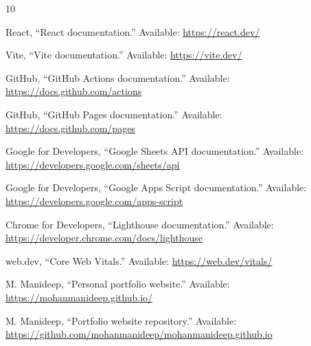 \documentclass[10pt,a4paper,twocolumn]{article}
\begin{document}
\begin{thebibliography}{10}

React, ``React documentation.'' Available: \url{https://react.dev/}

Vite, ``Vite documentation.'' Available: \url{https://vite.dev/}

GitHub, ``GitHub Actions documentation.'' Available: \url{https://docs.github.com/actions}

GitHub, ``GitHub Pages documentation.'' Available: \url{https://docs.github.com/pages}

Google for Developers, ``Google Sheets API documentation.'' Available: \url{https://developers.google.com/sheets/api}

Google for Developers, ``Google Apps Script documentation.'' Available: \url{https://developers.google.com/apps-script}

Chrome for Developers, ``Lighthouse documentation.'' Available: \url{https://developer.chrome.com/docs/lighthouse}

web.dev, ``Core Web Vitals.'' Available: \url{https://web.dev/vitals/}

M. Manideep, ``Personal portfolio website.'' Available: \url{https://mohanmanideep.github.io/}

M. Manideep, ``Portfolio website repository.'' Available: \url{https://github.com/mohanmanideep/mohanmanideep.github.io}

\end{thebibliography}
\end{document}
